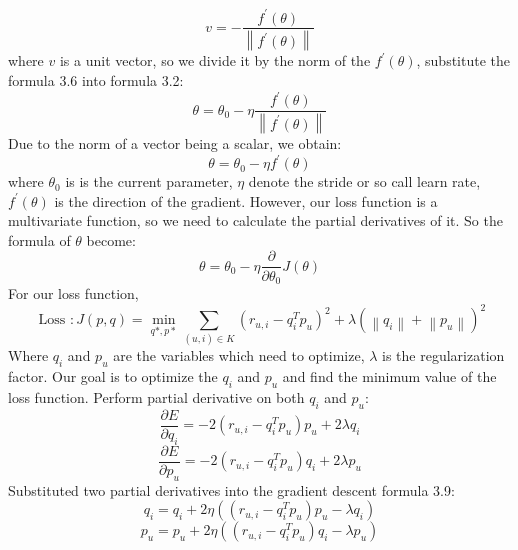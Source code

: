 \begin{equation}
    v=-\frac{f^{\prime}(\theta)}{\left\|f^{\prime}(\theta)\right\|}
\end{equation}
where $v$ is a unit vector, so we divide it by the norm of the $f^{\prime}(\theta)$, substitute the formula 3.6 into formula 3.2:
\begin{equation}
    \theta=\theta_{0}-\eta \frac{f^{\prime}(\theta)}{\left\|f^{\prime}(\theta)\right\|}
\end{equation}
Due to the norm of a vector being a scalar, we obtain:
\begin{equation}
    \theta=\theta_{0}-\eta f^{\prime}(\theta)
\end{equation}
where $\theta_{0}$ is is the current parameter, $\eta$ denote the stride or so call learn rate, $f^{\prime}(\theta)$ is the direction of the gradient.
However, our loss function is a multivariate function, so we need to calculate the partial derivatives of it. So the formula of $\theta$ become:
\begin{equation}
    \theta=\theta_{0}-\eta  \frac{\partial}{\partial \theta_{0}} J(\theta)
\end{equation}
For our loss function,
\begin{equation}
        \text { Loss }: J(p, q)=\min_{ q *, p * } \sum_{(u, i) \in K}\left(r_{u,i}-q_{i}^{T} p_{u}\right)^{2}+\lambda\left(\left\|q_{i}\right\|+\left\|p_{u}\right\|\right)^{2}
\end{equation}
Where $q_{i}$ and $p_{u}$ are the variables which need to optimize, $\lambda$ is the regularization factor. Our goal is to optimize the $q_{i}$ and $p_{u}$ and find the minimum value of the loss function.
Perform partial derivative on both $q_{i}$ and $p_{u}$:
    \begin{equation}
        \frac{\partial E}{\partial q_{i}}=-2\left(r_{u,i}-q_{i}^{T} p_{u}\right) p_{u}+2 \lambda q_{i}
    \end{equation}
    \begin{equation}
        \frac{\partial E}{\partial p_{u}}=-2\left(r_{u,i}-q_{i}^{T} p_{u}\right) q_{i}+2 \lambda p_{u}
\end{equation}
Substituted two partial derivatives into the gradient descent formula 3.9:
\begin{equation}
    q_{i}=q_{i}+2 \eta\left(\left(r_{u,i}-q_{i}^{T} p_{u}\right) p_{u}-\lambda q_{i}\right)
\end{equation}
\begin{equation}
    p_{u}=p_{u}+2 \eta\left(\left(r_{u,i}-q_{i}^{T} p_{u}\right) q_{i}-\lambda p_{u}\right)
\end{equation}
